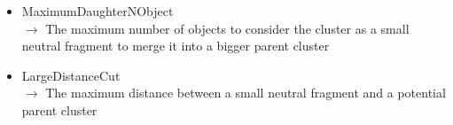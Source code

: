 \documentclass[cits]{JINST}
\begin{document}
\begin{itemize}
  \item MaximumDaughterNObject \\
  $\rightarrow$ The maximum number of objects to consider the cluster as a small neutral fragment to merge it into a bigger parent cluster
  \item LargeDistanceCut \\
  $\rightarrow$ The maximum distance between a small neutral fragment and a potential parent cluster
\end{itemize}
\end{document}
